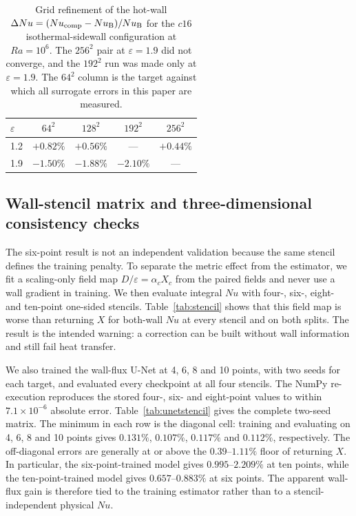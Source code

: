 \documentclass[preprint,11pt,a4paper,times]{elsarticle}
\begin{document}
\begin{table}[htbp]
\centering
\caption{Grid refinement of the hot-wall
$\Delta Nu=(Nu_{\rm comp}-Nu_{\rm B})/Nu_{\rm B}$ for the $c16$ isothermal-sidewall
configuration at $Ra=10^6$. The $256^2$ pair at $\varepsilon=1.9$ did not converge, and the
$192^2$ run was made only at $\varepsilon=1.9$. The $64^2$ column is the target against which
all surrogate errors in this paper are measured.}
\label{tab:grid}
\setlength{\tabcolsep}{6pt}
\begin{tabular}{@{}lcccc@{}}
\toprule
$\varepsilon$ & $64^2$ & $128^2$ & $192^2$ & $256^2$\\
\midrule
1.2 & $+0.82\%$ & $+0.56\%$ & --- & $+0.44\%$\\
1.9 & $-1.50\%$ & $-1.88\%$ & $-2.10\%$ & ---\\
\bottomrule
\end{tabular}
\end{table}

\subsection{Wall-stencil matrix and three-dimensional consistency checks}
\label{sec:stencil3d}

The six-point result is not an independent validation because the same stencil defines the
training penalty. To separate the metric effect from the estimator, we fit a scaling-only
field map $D/\varepsilon=\alpha_c X_c$ from the paired fields and never use a wall gradient in
training. We then evaluate integral $Nu$ with four-, six-, eight- and ten-point one-sided
stencils. Table~\ref{tab:stencil} shows that this field map is worse than returning $X$ for
both-wall $Nu$ at every stencil and on both splits. The result is the intended warning: a
correction can be built without wall information and still fail heat transfer.

We also trained the wall-flux U-Net at 4, 6, 8 and 10 points, with two seeds for each target,
and evaluated every checkpoint at all four stencils. The NumPy re-execution reproduces the
stored four-, six- and eight-point values to within $7.1\times10^{-6}$ absolute error.
Table~\ref{tab:unetstencil} gives the complete two-seed matrix. The minimum in each row is
the diagonal cell: training and evaluating on 4, 6, 8 and 10 points gives $0.131\%$,
$0.107\%$, $0.117\%$ and $0.112\%$, respectively. The off-diagonal errors are generally at
or above the $0.39$--$1.11\%$ floor of returning $X$. In particular, the six-point-trained
model gives $0.995$--$2.209\%$ at ten points, while the ten-point-trained model gives
$0.657$--$0.883\%$ at six points. The apparent wall-flux gain is therefore tied to the
training estimator rather than to a stencil-independent physical $Nu$.
\end{document}
